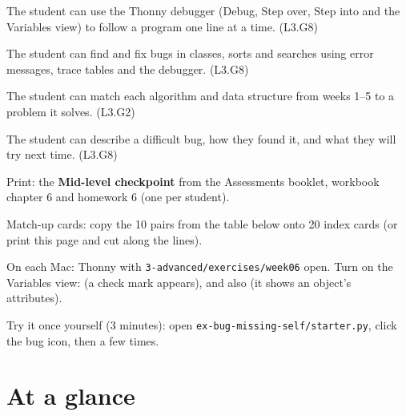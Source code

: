 
\begin{objectives}
  \item The student can use the Thonny debugger (Debug, Step over, Step into and the Variables view) to follow a program one line at a time. (L3.G8)
  \item The student can find and fix bugs in classes, sorts and searches using error messages, trace tables and the debugger. (L3.G8)
  \item The student can match each algorithm and data structure from weeks 1--5 to a problem it solves. (L3.G2)
  \item The student can describe a difficult bug, how they found it, and what they will try next time. (L3.G8)
\end{objectives}

\begin{materials}
  \item Print: the \textbf{Mid-level checkpoint} from the Assessments booklet, workbook chapter 6 and homework 6 (one per student).
  \item Match-up cards: copy the 10 pairs from the table below onto 20 index cards (or print this page and cut along the lines).
  \item On each Mac: Thonny with \texttt{3-advanced/exercises/week06} open. Turn on the Variables view:  (a check mark appears), and also  (it shows an object's attributes).
  \item Try it once yourself (3 minutes): open \texttt{ex-bug-missing-self/starter.py}, click the bug icon, then  a few times.
\end{materials}

\section{At a glance}
\begin{timeplan}
\end{timeplan}

